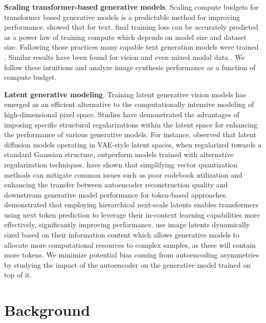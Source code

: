 \textbf{Scaling transformer-based generative models}.
\label{sec:relatedworks:scaling}
Scaling compute budgets for transformer based generative models is a predictable method for improving performance. \cite{kaplan2020scaling, hoffmann2022training, clark2022unified} showed that for text, final training loss can be accurately predicted as a power law of training compute which depends on model size and dataset size. Following those practices many capable text generation models were trained \citep{touvron2023llama, brown2020language, rae2022scaling}. Similar results have been found for vision \citep{zhai2022scaling, alabdulmohsin2024getting, esser2024scaling, dehghani2023scaling} and even mixed modal data \citep{aghajanyan2023scaling}. We follow these intuitions and analyze image synthesis performance as a function of compute budget.

\textbf{Latent generative modeling}.
\label{sec:relatedworks:latgenmod}
Training latent generative vision models has emerged as an efficient alternative to the computationally intensive modeling of high-dimensional pixel space. Studies have demonstrated the advantages of imposing specific structural regularizations within the latent space for enhancing the performance of various generative models. For instance, \cite{rombach2022highresolution} observed that latent diffusion models operating in VAE-style \cite{kingma2022autoencoding} latent spaces, when regularized towards a standard Gaussian structure, outperform models trained with alternative regularization techniques. \cite{yu2024language, mentzer2023finite, yu2022vectorquantized} have shown that simplifying vector quantization methods can mitigate common issues such as poor codebook utilization and enhancing the transfer between autoencoder reconstruction quality and downstream generative model performance for token-based approaches. \cite{tian2024visual} demonstrated that employing hierarchical next-scale latents enables transformers using next token prediction to leverage their in-context learning capabilities more effectively, significantly improving performance. \cite{jin2024unified} use image latents dynamically sized based on their information content which allows generative models to allocate more computational resources to complex samples, as these will contain more tokens. We minimize potential bias coming from autoencoding asymmetries by studying the impact of the autoencoder on the generative model trained on top of it.

\section{Background}
\label{sec:methods}
